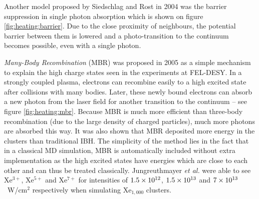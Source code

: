 
Another model proposed by Siedschlag and Rost\cite{Siedschlag2004} in 2004 was
the barrier suppression in single photon absorption which is shown on figure
\ref{fig:heating:barrier}. Due to the close proximity
of neighbours, the potential barrier between them is lowered and
a photo-transition to the continuum becomes possible, even with a single photon.



\textit{Many-Body Recombination} (MBR) was proposed in 2005\cite{Jungreuthmayer2005}
as a simple mechanism to explain the high charge states seen in the
experiments at FEL-DESY. In a strongly coupled plasma, electrons can recombine
easily to a high excited
state after collisions with many bodies. Later, these newly bound electrons can
absorb a new photon from the laser field for another transition to the
continuum -- see figure \ref{fig:heating:mbr}.
Because MBR is much more efficient than three-body
recombination (due to the large density of charged particles), much more
photons are absorbed this way. It was also shown that MBR deposited more energy
in the clusters than traditional IBH.
The simplicity of the
method lies in the fact that in a classical MD simulation, MBR is automatically
included without extra implementation as the high excited states have energies
which are close to each other and can thus be treated classically.
Jungreuthmayer \textit{et al.} were able
to see Xe$^{3+}$, Xe$^{5+}$ and Xe$^{7+}$ for intensities of $\ten{1.5}{12}$,
$\ten{1.5}{13}$ and $\ten{7}{13}$~W/cm$^2$ respectively when simulating
Xe$_{1,000}$ clusters.

